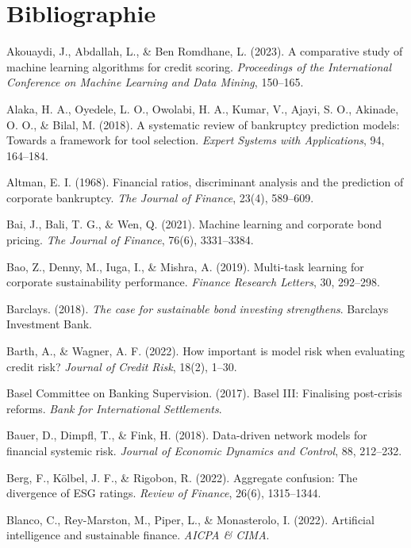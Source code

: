\chapter{Bibliographie}

\begin{thebibliography}{100}

Akouaydi, J., Abdallah, L., \& Ben Romdhane, L. (2023). A comparative study of machine learning algorithms for credit scoring. \textit{Proceedings of the International Conference on Machine Learning and Data Mining}, 150--165.

Alaka, H. A., Oyedele, L. O., Owolabi, H. A., Kumar, V., Ajayi, S. O., Akinade, O. O., \& Bilal, M. (2018). A systematic review of bankruptcy prediction models: Towards a framework for tool selection. \textit{Expert Systems with Applications}, 94, 164--184.

Altman, E. I. (1968). Financial ratios, discriminant analysis and the prediction of corporate bankruptcy. \textit{The Journal of Finance}, 23(4), 589--609.

Bai, J., Bali, T. G., \& Wen, Q. (2021). Machine learning and corporate bond pricing. \textit{The Journal of Finance}, 76(6), 3331--3384.

Bao, Z., Denny, M., Iuga, I., \& Mishra, A. (2019). Multi-task learning for corporate sustainability performance. \textit{Finance Research Letters}, 30, 292--298.

Barclays. (2018). \textit{The case for sustainable bond investing strengthens}. Barclays Investment Bank.

Barth, A., \& Wagner, A. F. (2022). How important is model risk when evaluating credit risk? \textit{Journal of Credit Risk}, 18(2), 1--30.

Basel Committee on Banking Supervision. (2017). Basel III: Finalising post-crisis reforms. \textit{Bank for International Settlements}.

Bauer, D., Dimpfl, T., \& Fink, H. (2018). Data-driven network models for financial systemic risk. \textit{Journal of Economic Dynamics and Control}, 88, 212--232.

Berg, F., Kölbel, J. F., \& Rigobon, R. (2022). Aggregate confusion: The divergence of ESG ratings. \textit{Review of Finance}, 26(6), 1315--1344.

Blanco, C., Rey-Marston, M., Piper, L., \& Monasterolo, I. (2022). Artificial intelligence and sustainable finance. \textit{AICPA \& CIMA}.


\end{thebibliography}
